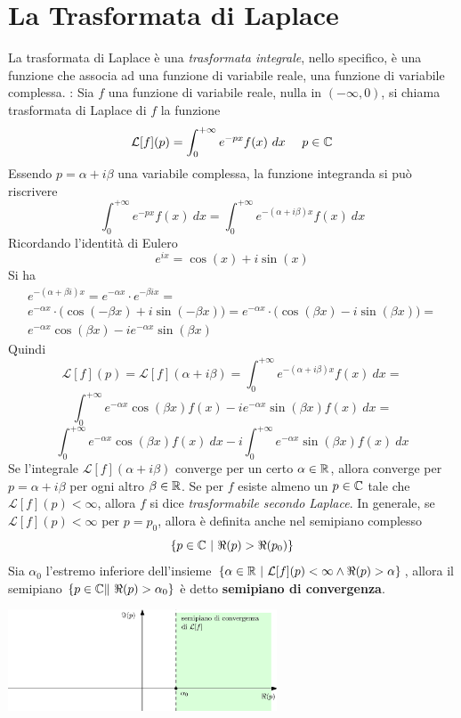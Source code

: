 \documentclass[10pt, letterpaper]{report}
\begin{document}
\section{La Trasformata di Laplace} 
La trasformata di Laplace è una \textit{trasformata integrale}, nello specifico, è una 
funzione che associa ad una funzione di variabile reale, una funzione di variabile 
complessa.\acc 
{} : Sia $f$ una funzione di variabile reale, nulla 
in $(-\infty,0)$, si chiama trasformata di Laplace di $f$ la funzione 
$$ \mathcal{L}[f](p)=\int_0^{+\infty} e^{-px}f(x)\ dx \ \ \ \ p\in \C$$
Essendo $p = \alpha + i\beta$ una variabile complessa, la funzione integranda si può riscrivere 
$$\int_0^{+\infty} e^{-px}f(x)\ dx = 
\int_0^{+\infty} e^{-(\alpha + i\beta)x}f(x)\ dx$$
Ricordando l'identità di Eulero $$ e^{ix}=\cos(x)+i\sin(x)$$
Si ha 
\begin{eqnarray}
    e^{-(\alpha + \beta i)x} = e^{-\alpha x}\cdot e^{-\beta i x} =\\ 
    e^{-\alpha x}\cdot \Big(
    \cos(-\beta x)+ i \sin(-\beta x)    
    \Big) = e^{-\alpha x}\cdot \Big(
        \cos(\beta x)- i \sin(\beta x)    
        \Big) = \\ 
        e^{-\alpha x}\cos(\beta x)- i e^{-\alpha x}\sin(\beta x)
\end{eqnarray}
Quindi $$ \mathcal{L}[f](p)=\mathcal{L}[f](\alpha + i\beta)=
\int_0^{+\infty} e^{-(\alpha + i\beta)x}f(x)\ dx=
$$
$$
\int_0^{+\infty} e^{-\alpha x}\cos(\beta x)f(x)-ie^{-\alpha x}\sin(\beta x)f(x)\ dx =$$
$$ 
\int_0^{+\infty} e^{-\alpha x}\cos(\beta x)f(x)\ dx-i\int_0^{+\infty}e^{-\alpha x}\sin(\beta x)f(x)\ dx
$$
Se l'integrale $\mathcal{L}[f](\alpha + i\beta)$ converge per un certo
 $\alpha \in {\mathbb R}$, allora converge per $p = \alpha + i\beta$ per ogni altro $\beta \in {\mathbb R}$. Se per 
 $f$ esiste almeno un $p\in{\mathbb C}$ tale che $\mathcal{L}[f](p)<\infty$, allora $f$ si dice 
 \textit{trasformabile secondo Laplace}.\acc
 In generale, se $\mathcal{L}[f](p)<\infty$ per $p=p_0$, allora è definita anche nel semipiano 
 complesso $$\{p\in {\mathbb C} \ |\ \Re(p)>\Re(p_0)\}$$
 Sia $\alpha_0$ l'estremo inferiore dell'insieme $\{\alpha \in {\mathbb R} \ |\ \mathcal{L}[f](p)<\infty\land \Re(p)>\alpha\}$, allora 
 il semipiano $\{p\in \C \|\ \Re(p)>\alpha_0\}$ è detto \textbf{semipiano di convergenza}.
 \begin{center}
    \includegraphics[width=0.6\textwidth ]{images/semiPianoConv.eps}
 \end{center}
\end{document}
